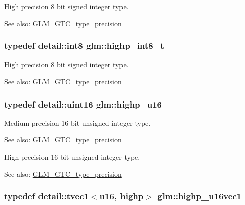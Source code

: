 High precision 8 bit signed integer type. \begin{Desc}
\item[See also:]\hyperlink{group__gtc__type__precision}{GLM\_\-GTC\_\-type\_\-precision} \end{Desc}
\hypertarget{group__gtc__type__precision_g417701b99e6e7992f35ab2ef694f88b2}{
\subsubsection[highp\_\-int8\_\-t]{\setlength{\rightskip}{0pt plus 5cm}typedef detail::int8 {\bf glm::highp\_\-int8\_\-t}}}
\label{group__gtc__type__precision_g417701b99e6e7992f35ab2ef694f88b2}


High precision 8 bit signed integer type. \begin{Desc}
\item[See also:]\hyperlink{group__gtc__type__precision}{GLM\_\-GTC\_\-type\_\-precision} \end{Desc}
\hypertarget{group__gtc__type__precision_g9da2178d7501d9c0f225fa1a7b70cb45}{
\subsubsection[highp\_\-u16]{\setlength{\rightskip}{0pt plus 5cm}typedef detail::uint16 {\bf glm::highp\_\-u16}}}
\label{group__gtc__type__precision_g9da2178d7501d9c0f225fa1a7b70cb45}


Medium precision 16 bit unsigned integer type. \begin{Desc}
\item[See also:]\hyperlink{group__gtc__type__precision}{GLM\_\-GTC\_\-type\_\-precision}\end{Desc}
High precision 16 bit unsigned integer type. \begin{Desc}
\item[See also:]\hyperlink{group__gtc__type__precision}{GLM\_\-GTC\_\-type\_\-precision} \end{Desc}
\hypertarget{group__gtc__type__precision_gc4a83dec879b77ab0055c8da232da066}{
\subsubsection[highp\_\-u16vec1]{\setlength{\rightskip}{0pt plus 5cm}typedef detail::tvec1$<$u16, highp$>$ {\bf glm::highp\_\-u16vec1}}}
\label{group__gtc__type__precision_gc4a83dec879b77ab0055c8da232da066}


